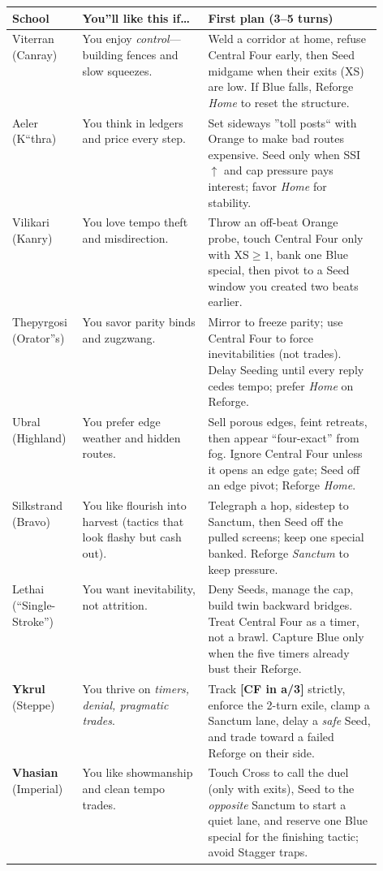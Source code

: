 \documentclass[11pt]{article}
\begin{document}
\vspace{0.5em}
\noindent\begin{tabularx}{\linewidth}{@{}p{0.19\linewidth}p{0.34\linewidth}X@{}}
\toprule
\textbf{School} & \textbf{You''ll like this if\dots} & \textbf{First plan (3--5 turns)} \\
\midrule
Viterran (Canray) & You enjoy \emph{control}---building fences and slow squeezes. & Weld a corridor at home, refuse Central Four early, then Seed midgame when their exits (XS) are low. If Blue falls, Reforge \emph{Home} to reset the structure. \\
Aeler (K``thra) & You think in ledgers and price every step. & Set sideways ''toll posts`` with Orange to make bad routes expensive. Seed only when SSI\,$\uparrow$ and cap pressure pays interest; favor \emph{Home} for stability. \\
Vilikari (Kanry) & You love tempo theft and misdirection. & Throw an off-beat Orange probe, touch Central Four only with XS$\ge 1$, bank one Blue special, then pivot to a Seed window you created two beats earlier. \\
Thepyrgosi (Orator''s) & You savor parity binds and zugzwang. & Mirror to freeze parity; use Central Four to force inevitabilities (not trades). Delay Seeding until every reply cedes tempo; prefer \emph{Home} on Reforge. \\
Ubral (Highland) & You prefer edge weather and hidden routes. & Sell porous edges, feint retreats, then appear ``four-exact'' from fog. Ignore Central Four unless it opens an edge gate; Seed off an edge pivot; Reforge \emph{Home}. \\
Silkstrand (Bravo) & You like flourish into harvest (tactics that look flashy but cash out). & Telegraph a hop, sidestep to Sanctum, then Seed off the pulled screens; keep one special banked. Reforge \emph{Sanctum} to keep pressure. \\
Lethai (``Single-Stroke'') & You want inevitability, not attrition. & Deny Seeds, manage the cap, build twin backward bridges. Treat Central Four as a timer, not a brawl. Capture Blue only when the five timers  already bust their Reforge. \\
\textbf{Ykrul} (Steppe) & You thrive on \emph{timers, denial, pragmatic trades}. & Track \textbf{[CF in a/3]} strictly, enforce the 2-turn exile, clamp a Sanctum lane, delay a \emph{safe} Seed, and trade toward a failed Reforge on their side. \\
\textbf{Vhasian} (Imperial) & You like showmanship and clean tempo trades. & Touch Cross to call the duel (only with exits), Seed to the \emph{opposite} Sanctum to start a quiet lane, and reserve one Blue special for the finishing tactic; avoid Stagger traps. \\
\bottomrule
\end{tabularx}
\end{document}
